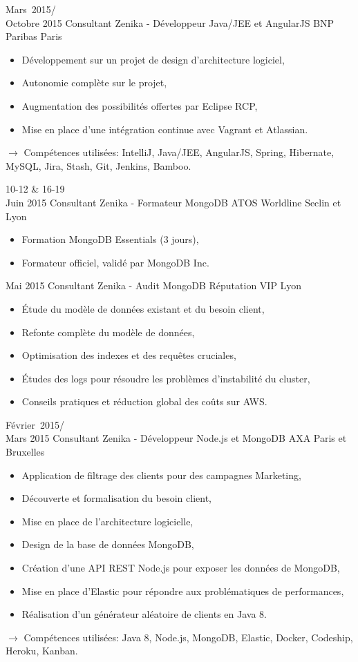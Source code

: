 \documentclass[11pt,a4paper]{moderncv}
\begin{document}
\cventry
{Mars\ 2015/\\Octobre 2015}
{Consultant Zenika - Développeur Java/JEE et AngularJS}
{BNP Paribas}
{Paris}
{}
{\begin{itemize}
\item Développement sur un projet de design d'architecture logiciel,
\item Autonomie complète sur le projet, 
\item Augmentation des possibilités offertes par Eclipse RCP,
\item Mise en place d'une intégration continue avec Vagrant et Atlassian.
\end{itemize}
$\rightarrow$ Compétences utilisées: IntelliJ, Java/JEE, AngularJS, Spring, Hibernate, MySQL, Jira, Stash, Git, Jenkins, Bamboo.
}   %

\cventry
{10-12 \& 16-19\\ Juin 2015}
{Consultant Zenika - Formateur MongoDB}
{ATOS Worldline}
{Seclin et Lyon}
{}
{\begin{itemize}
\item Formation MongoDB Essentials (3 jours),
\item Formateur officiel, validé par MongoDB Inc.
\end{itemize}
}   %

\cventry
{Mai 2015}
{Consultant Zenika - Audit MongoDB}
{Réputation VIP}
{Lyon}
{}
{\begin{itemize}
\item \'Etude du modèle de données existant et du besoin client,
\item Refonte complète du modèle de données,
\item Optimisation des indexes et des requêtes cruciales,
\item \'Etudes des logs pour résoudre les problèmes d'instabilité du cluster,
\item Conseils pratiques et réduction global des coûts sur AWS.
\end{itemize}
}   %

\cventry
{Février\ 2015/\\Mars 2015}
{Consultant Zenika - Développeur Node.js et MongoDB}
{AXA}
{Paris et Bruxelles}
{}
{\begin{itemize}
\item Application de filtrage des clients pour des campagnes Marketing,
\item Découverte et formalisation du besoin client,
\item Mise en place de l'architecture logicielle,
\item Design de la base de données MongoDB,
\item Création d'une API REST Node.js pour exposer les données de MongoDB,
\item Mise en place d'Elastic pour répondre aux problématiques de performances,
\item Réalisation d'un générateur aléatoire de clients en Java 8.
\end{itemize}
$\rightarrow$ Compétences utilisées: Java 8, Node.js, MongoDB, Elastic, Docker, Codeship, Heroku, Kanban.
}   %
\end{document}
